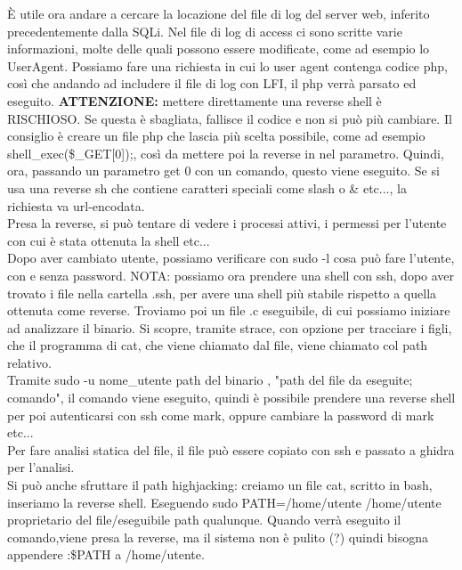 \documentclass{article}
\begin{document}
È utile ora andare a cercare la locazione del file di log del server web, inferito precedentemente dalla SQLi. Nel file di log di access ci sono scritte varie informazioni, molte delle quali possono essere modificate, come ad esempio lo UserAgent. Possiamo fare una richiesta in cui lo user agent contenga codice php, così che andando ad includere il file di log con LFI, il php verrà parsato ed eseguito. \textbf{ATTENZIONE:} mettere direttamente una reverse shell è RISCHIOSO. Se questa è sbagliata, fallisce il codice e non si può più cambiare. Il consiglio è creare un file php che lascia più scelta possibile, come ad esempio shell\_exec(\$\_GET[0]);, così da mettere poi la reverse in nel parametro. Quindi, ora, passando un parametro get 0 con un comando, questo viene eseguito. Se si usa una reverse sh che contiene caratteri speciali come slash o \& etc..., la richiesta va url-encodata.\\ Presa la reverse, si può tentare di vedere i processi attivi, i permessi per l'utente con cui è stata ottenuta la shell etc...	\\ Dopo aver cambiato utente, possiamo verificare con sudo -l cosa può fare l'utente, con e senza password. NOTA: possiamo ora prendere una shell con ssh, dopo aver trovato i file nella cartella .ssh, per avere una shell più stabile rispetto a quella ottenuta come reverse. Troviamo poi un file .c eseguibile, di cui possiamo iniziare ad analizzare il binario. Si scopre, tramite strace, con opzione per tracciare i figli, che il programma di cat, che viene chiamato dal file, viene chiamato col path relativo.\\ Tramite sudo -u nome\_utente path del binario , "path del file da eseguite; comando", il comando viene eseguito, quindi è possibile prendere una reverse shell per poi autenticarsi con ssh come mark, oppure cambiare la password di mark etc...\\ Per fare analisi statica del file, il file può essere copiato con ssh e passato a ghidra per l'analisi.\\ Si può anche sfruttare il path highjacking: creiamo un file cat, scritto in bash, inseriamo la reverse shell. Eseguendo sudo PATH=/home/utente /home/utente proprietario del file/eseguibile path qualunque. Quando verrà eseguito il comando,viene presa la reverse, ma il sistema non è pulito (?) quindi bisogna appendere :\$PATH a /home/utente.
\end{document}
